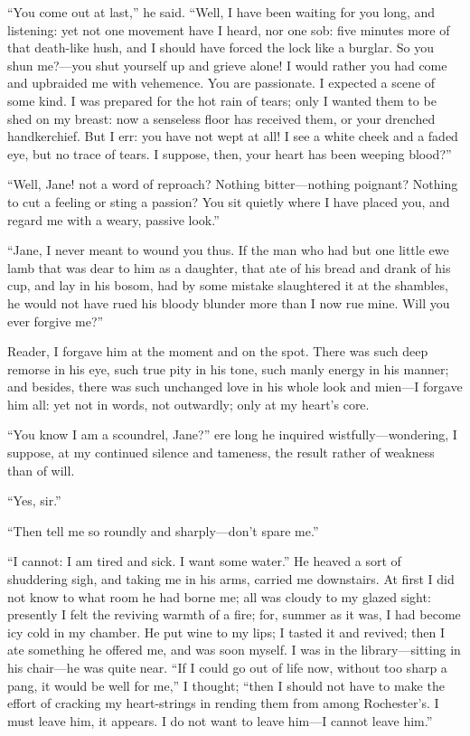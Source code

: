 \enquote{You come out at last,} he said. \enquote{Well, I have been
	waiting for you long, and listening: yet not one movement have I heard,
	nor one sob: five minutes more of that death-like hush, and I should
	have forced the lock like a burglar. So you shun me?---you shut
	yourself up and grieve alone! I would rather you had come and upbraided
	me with vehemence. You are passionate. I expected a scene of some
	kind. I was prepared for the hot rain of tears; only I wanted them to
	be shed on my breast: now a senseless floor has received them, or your
	drenched handkerchief. But I err: you have not wept at all! I see a
	white cheek and a faded eye, but no trace of tears. I suppose, then,
	your heart has been weeping blood?}

\enquote{Well, Jane! not a word of reproach? Nothing bitter---nothing
	poignant? Nothing to cut a feeling or sting a passion? You sit quietly
	where I have placed you, and regard me with a weary, passive look.}

\enquote{Jane, I never meant to wound you thus. If the man who had but
	one little ewe lamb that was dear to him as a daughter, that ate of his
	bread and drank of his cup, and lay in his bosom, had by some mistake
	slaughtered it at the shambles, he would not have rued his bloody
	blunder more than I now rue mine. Will you ever forgive me?}

Reader, I forgave him at the moment and on the spot. There was such
deep remorse in his eye, such true pity in his tone, such manly energy
in his manner; and besides, there was such unchanged love in his whole
look and mien---I forgave him all: yet not in words, not outwardly; only
at my heart's core.

\enquote{You know I am a scoundrel, Jane?} ere long he inquired
wistfully---wondering, I suppose, at my continued silence and tameness,
the result rather of weakness than of will.

\enquote{Yes, sir.}

\enquote{Then tell me so roundly and sharply---don't spare me.}

\enquote{I cannot: I am tired and sick. I want some water.} He heaved
a sort of shuddering sigh, and taking me in his arms, carried me
downstairs. At first I did not know to what room he had borne me; all
was cloudy to my glazed sight: presently I felt the reviving warmth of a
fire; for, summer as it was, I had become icy cold in my chamber. He
put wine to my lips; I tasted it and revived; then I ate something he
offered me, and was soon myself. I was in the library---sitting in his
chair---he was quite near. \enquote{If I could go out of life now,
	without too sharp a pang, it would be well for me,} I thought;
\enquote{then I should not have to make the effort of cracking my
	heart-strings in rending them from among \Mr{} Rochester's. I must leave
	him, it appears. I do not want to leave him---I cannot leave him.}

